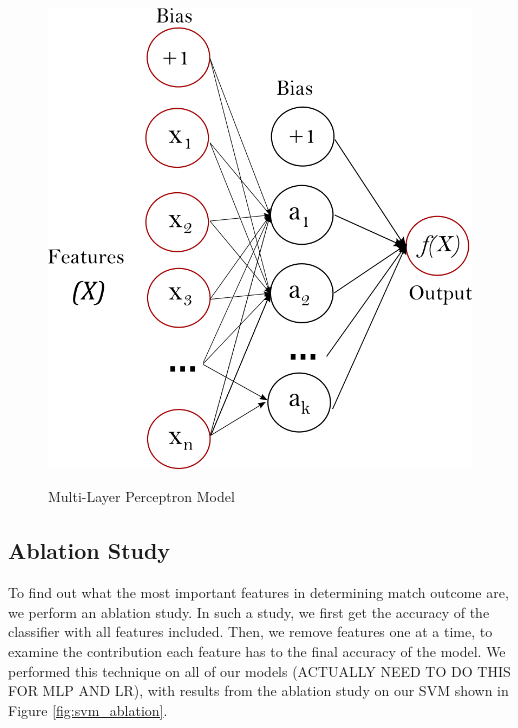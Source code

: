 \documentclass[conference]{IEEEtran}
\begin{document}
		\begin{figure}[h]
		\includegraphics[scale=0.3]{mlp} %
		\label{fig:multi-layer perceptron}
		\centering
		\caption{Multi-Layer Perceptron Model}
		\end{figure}

	\subsection{Ablation Study}
	To find out what the most important features in determining match outcome are, we perform an ablation study. In such a study, we first get the accuracy of the classifier with all features included. Then, we remove features one at a time, to examine the contribution each feature has to the final accuracy of the model. We performed this technique on all of our models (ACTUALLY NEED TO DO THIS FOR MLP AND LR), with results from the ablation study on our SVM shown in Figure \ref{fig:svm_ablation}.
\end{document}
